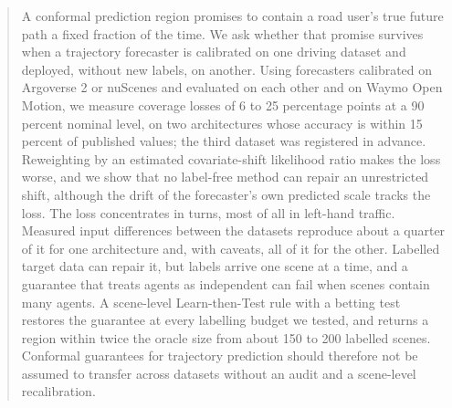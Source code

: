 \begin{abstract}
A conformal prediction region promises to contain a road user's true future path a fixed fraction of the time. We ask
whether that promise survives when a trajectory forecaster is calibrated on one driving dataset and deployed, without
new labels, on another. Using forecasters calibrated on Argoverse 2 or nuScenes and evaluated on each other and on
Waymo Open Motion, we measure coverage losses of 6 to 25 percentage points at a 90 percent nominal level, on two
architectures whose accuracy is within 15 percent of published values; the third dataset was registered in advance.
Reweighting by an estimated covariate-shift likelihood ratio makes the loss worse, and we show that no label-free method
can repair an unrestricted shift, although the drift of the forecaster's own predicted scale tracks the loss. The loss
concentrates in turns, most of all in left-hand traffic. Measured input
differences between the datasets reproduce about a quarter of it for one architecture and, with caveats, all of it for
the other. Labelled target data can repair it, but labels arrive one scene at a time, and a guarantee that treats agents
as independent can fail when scenes contain many agents. A scene-level Learn-then-Test rule with a betting test restores
the guarantee at every labelling budget we tested, and returns a region within twice the oracle size from about 150 to
200 labelled scenes. Conformal guarantees for trajectory prediction should therefore not be assumed to transfer across
datasets without an audit and a scene-level recalibration.
\end{abstract}
